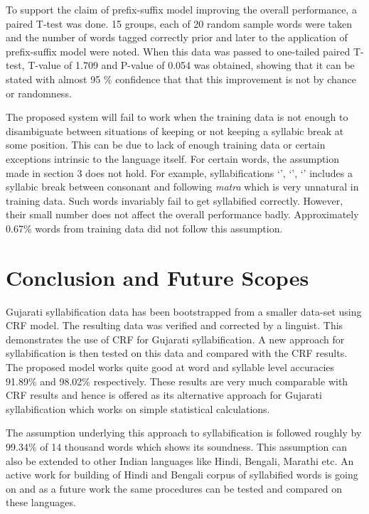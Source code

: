 \documentclass[runningheads,a4paper]{llncs}
\begin{document}
To support the claim of prefix-suffix model improving the overall performance, a paired T-test was done. 15 groups, each of 20 random sample words were taken and the number of words tagged correctly prior and later to the application of prefix-suffix model were noted. When this data was passed to one-tailed paired T-test, T-value of 1.709 and P-value of 0.054 was obtained, showing that it can be stated with almost 95 \% confidence that that this improvement is not by chance or randomness.

The proposed system will fail to work when the training data is not enough to disambiguate between situations of keeping or not keeping a syllabic break at some position. This can be due to lack of enough training data or certain exceptions intrinsic to the language itself. For certain words, the assumption made in section 3 does not hold. For example, syllabifications `{}', `{}', `{}' includes a syllabic break between consonant and following \emph{matra} which is very unnatural in training data. Such words invariably fail to get syllabified correctly. However, their small number does not affect the overall performance badly. Approximately 0.67\% words from training data did not follow this assumption.

\section{Conclusion and Future Scopes}
\label{section:conclusion_and_future_scope}

Gujarati syllabification data has been bootstrapped from a smaller data-set using CRF model. The resulting data was verified and corrected by a linguist. This demonstrates the use of CRF for Gujarati syllabification. A new approach for syllabification is then tested on this data and compared with the CRF results. The proposed model works quite good at word and syllable level accuracies 91.89\% and 98.02\% respectively. These results are very much comparable with CRF results and hence is offered as its alternative approach for Gujarati syllabification which works on simple statistical calculations.

The assumption underlying this approach to syllabification is followed roughly by 99.34\% of 14 thousand words which shows its soundness. This assumption can also be extended to other Indian languages like Hindi, Bengali, Marathi etc. An active work for building of Hindi and Bengali corpus of syllabified words is going on and as a future work the same procedures can be tested and compared on these languages.


\end{document}

